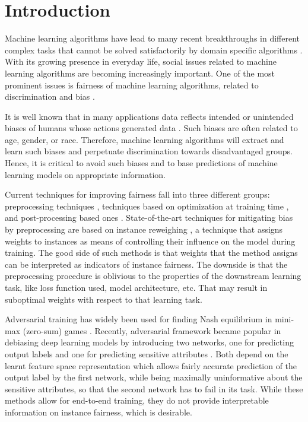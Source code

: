 \documentclass[preprint,12pt]{elsarticle}
\begin{document}

\section{Introduction}
\label{Sec:Introduction}
Machine learning algorithms have lead to many recent breakthroughs in different complex tasks that cannot be solved satisfactorily by domain specific algorithms \cite{kumar2019face,voulodimos2018deep,singh2017machine,domadiya2019review,bunker2019machine}. With its growing presence in everyday life, social issues related to machine learning algorithms are becoming increasingly important. One of the most prominent issues is fairness of machine learning algorithms, related to discrimination and bias \cite{hajian2016algorithmic}.

It is well known that in many applications data reflects intended or unintended biases of humans whose actions generated data \cite{innocenti2016mining,li2019credit,boyd1996relationship,kim2016data, wang2019approaching}. Such biases are often related to age, gender, or race. Therefore, machine learning algorithms will extract and learn such biases and perpetuate discrimination towards disadvantaged groups. Hence, it is critical to avoid such biases and to base predictions of machine learning models on appropriate information.

Current techniques for improving fairness fall into three different groups: preprocessing techniques \cite{kamiran2012decision,calmon2017optimized}, techniques based on optimization at training time \cite{zafar2019fairness,adel2019one,celis2019classification,kamishima2012fairness}, and post-processing based ones \cite{hardt2016equality, pleiss2017fairness}. State-of-the-art techniques for mitigating bias by preprocessing are based on instance reweighing \cite{kamiran2012data}, a technique that assigns weights to instances as means of controlling their influence on the model during training. The good side of such methods is that weights that the method assigns can be interpreted as indicators of instance fairness. The downside is that the preprocessing procedure is oblivious to the properties of the downstream learning task, like loss function used, model architecture, etc. That may result in suboptimal weights with respect to that learning task.

Adversarial training has widely been used for finding Nash equilibrium in mini-max (zero-sum) games \cite{goodfellow2014generative, nouiehed2019solving, hsieh2019finding}. Recently, adversarial framework became popular in debiasing deep learning models by introducing two networks, one for predicting output labels and one for predicting sensitive attributes \cite{wadsworth2018achieving, madras2018learning, cevora2020fair, grari2020adversarial}. Both depend on the learnt feature space representation which allows fairly accurate prediction of the output label by the first network, while being maximally uninformative about the sensitive attributes, so that the second network has to fail in its task. While these methods allow for end-to-end training, they do not provide interpretable information on instance fairness, which is desirable.
\end{document}
